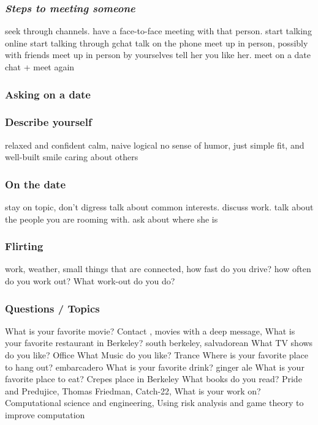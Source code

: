 \begin{frame} 
\frametitle{\textit{Steps to meeting someone}}
\begin{enumerate} 
\bllt seek through channels. 
\bllt have a face-to-face meeting with that person.
\bllt start talking online 
\bllt start talking through gchat 
\bllt talk on the phone
\bllt meet up in person, possibly with friends
\bllt meet up in person by yourselves 
\bllt tell her you like her.
\bllt meet on a date
\bllt chat +  meet again
\end{enumerate} 
\end{frame} 

\begin{frame} 
\frametitle{Asking on a date}
\begin{itemize} 
\bllt 
\bllt 
\bllt 
\end{itemize} 
\end{frame} 





\begin{frame} 
\frametitle{Describe yourself}
\begin{itemize} 
\bllt relaxed and confident
\bllt calm, naive
\bllt logical
\bllt no sense of humor, just simple 
\bllt fit, and well-built
\bllt smile 
\bllt caring about others
\end{itemize} 
\end{frame}

\begin{frame} 
\frametitle{On the date}
\begin{itemize} 
\bllt stay on topic, don't digress
\bllt talk about common interests. 
\bllt discuss work. 
\bllt talk about the people you are rooming with.
\bllt ask about where she is 
\end{itemize} 
\end{frame}

\begin{frame} 
\frametitle{Flirting}
\begin{itemize} 
\bllt work, weather, small things that are connected, 
\bllt how fast do you drive?
\bllt how often do you work out?  What work-out do you do? 
\end{itemize} 
\end{frame}




\begin{frame} 
\frametitle{ Questions / Topics }
\begin{itemize} 
\bllt What is your favorite movie? Contact ,   movies with a deep message, 
\bllt What is your favorite restaurant in Berkeley? south berkeley, salvadorean 
\bllt What TV shows do you like? Office
\bllt What Music do you like? Trance 
\bllt Where is your favorite place to hang out? embarcadero 
\bllt What is your favorite drink?  ginger ale
\bllt What is your favorite place to eat?  Crepes place in Berkeley
\bllt What books do you read?  Pride and Predujice, Thomas Friedman, Catch-22, 
\bllt What is your work on?  Computational science and engineering, Using risk analysis and game theory to improve computation 
\bllt 
\end{itemize} 
\end{frame}




